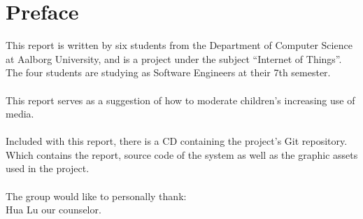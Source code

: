 \chapter*{Preface}
\label{chap:preface}
This report is written by six students from the Department of Computer Science at Aalborg University, and is a project under the subject ``Internet of Things''. The four students are studying as Software Engineers at their 7th semester.\\
\\
This report serves as a suggestion of how to moderate children's increasing use of media.\\
\\
Included with this report, there is a CD containing the project's Git repository. Which contains the report, source code of the system as well as the graphic assets used in the project.\\
\\
The group would like to personally thank:\\
Hua Lu our counselor.
